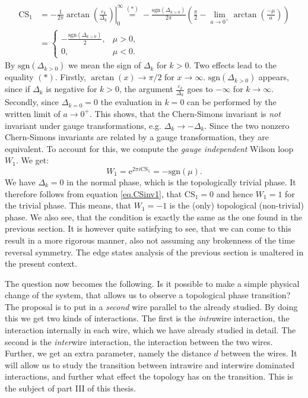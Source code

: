 \begin{align}
\text{CS}_1 &= - \frac{1}{2\pi} \left. \arctan\left(\frac{\varepsilon_k}{\Delta_k}\right)\right|^\infty_0 \overset{(*)}{=} -\frac{\text{sgn}(\Delta_{k>0})}{2\pi}\left(\frac{\pi}{2} - \lim_{a\to 0^{+}}\arctan\left(\frac{-\mu}{a}\right) \right) \nonumber \\
& = \left\{ \begin{matrix} -\frac{\text{sgn}(\Delta_{k>0})}{2}, & \mu > 0, \\ 0, & \mu < 0. \end{matrix} \right. 
\label{eq.CSinv2}
\end{align}
By $\text{sgn}(\Delta_{k>0})$ we mean the sign of $\Delta_k$ for $k > 0$. Two effects lead to the equality $(*)$. Firstly, $\arctan(x) \to \pi/2$ for $x \to \infty$. $\text{sgn}(\Delta_{k>0})$ appears, since if $\Delta_k$ is negative for $k > 0$, the argument $\frac{\varepsilon_k}{\Delta_k}$ goes to $-\infty$ for $k \to \infty$. Secondly, since $\Delta_{k=0} = 0$ the evaluation in $k = 0$ can be performed by the written limit of $a \to 0^+$. This shows, that the Chern-Simons invariant is \textit{not} invariant under gauge transformations, e.g. $\Delta_k \to - \Delta_k$. Since the two nonzero Chern-Simons invariants are related by a gauge transformation, they are equivalent. To account for this, we compute the \textit{gauge independent} Wilson loop $W_1$. We get: 
\begin{equation}
W_1 = \text{e}^{2\pi i \text{CS}_1} = -\text{sgn}(\mu). 
\end{equation}
We have $\Delta_k = 0$ in the normal phase, which is the topologically trivial phase. It therefore follows from equation \eqref{eq.CSinv1}, that $\text{CS}_1 = 0$ and hence $W_1 = 1$ for the trivial phase. This means, that $W_1 = -1$ is the (only) topological (non-trivial) phase. We also see, that the condition is exactly the same as the one found in the previous section. It is however quite satisfying to see, that we can come to this result in a more rigorous manner, also not assuming any brokenness of the time reversal symmetry. The edge states analysis of the previous section is unaltered in the present context.  

\vspace{1cm}
The question now becomes the following. Is it possible to make a simple physical change of the system, that allows us to observe a topological phase transition? The proposal is to put in a \textit{second} wire parallel to the already studied. By doing this we get two kinds of interactions. The first is the \textit{intra}wire interaction, the interaction internally in each wire, which we have already studied in detail. The second is the \textit{inter}wire interaction, the interaction between the two wires. Further, we get an extra parameter, namely the distance $d$ between the wires. It will allow us to study the transition between intrawire and interwire dominated interactions, and further what effect the topology has on the transition. This is the subject of part III of this thesis. 

